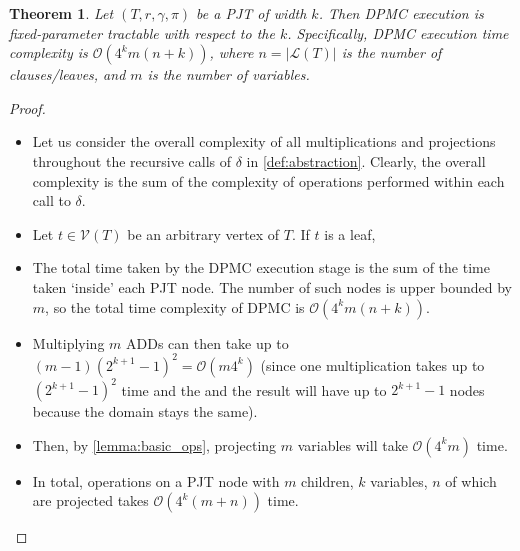 \documentclass{article}
\newtheorem{theorem}{Theorem}
\theoremstyle{definition}
\theoremstyle{remark}
\begin{document}
\begin{theorem}
  Let $(T, r, \gamma, \pi)$ be a PJT of width $k$. Then \textsc{DPMC} execution
  is fixed-parameter tractable with respect to the $k$. Specifically,
  \textsc{DPMC} execution time complexity is $\mathcal{O}(4^km(n+k))$, where $n
  = |\mathcal{L}(T)|$ is the number of clauses/leaves, and $m$ is the number of
  variables.
\end{theorem}
\begin{proof}
  \begin{itemize}
  \item Let us consider the overall complexity of all multiplications and
    projections throughout the recursive calls of $\delta$ in
    \cref{def:abstraction}. Clearly, the overall complexity is the sum of the
    complexity of operations performed within each call to $\delta$.
  \item Let $t \in \mathcal{V}(T)$ be an arbitrary vertex of $T$. If $t$ is a
    leaf,
  \item The total time taken by the DPMC execution stage is the sum of the time
    taken `inside' each PJT node. The number of such nodes is upper bounded by
    $m$, so the total time complexity of DPMC is $\mathcal{O}(4^km(n+k))$.
  \item Multiplying $m$ ADDs can then take up to $(m-1)(2^{k+1}-1)^2 =
    \mathcal{O}(m4^k)$ (since one multiplication takes up to $(2^{k+1}-1)^2$
    time and the and the result will have up to $2^{k+1} - 1$ nodes because the
    domain stays the same).
  \item Then, by \cref{lemma:basic_ops}, projecting $m$ variables will take
    $\mathcal{O}(4^km)$ time.
  \item In total, operations on a PJT node with $m$ children, $k$ variables, $n$ of
    which are projected takes $\mathcal{O}(4^k(m+n))$ time.
  \end{itemize}
\end{proof}



\end{document}
